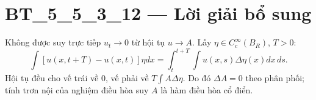 \documentclass[10pt,a4paper]{article}
\begin{document}
\section*{BT\_5\_5\_3\_12 — Lời giải bổ sung}
Không được suy trực tiếp $u_t\to0$ từ hội tụ $u\to A$. Lấy $\eta\in C_c^\infty(B_R)$, $T>0$:
\[\int[u(x,t+T)-u(x,t)]\eta dx=\int_t^{t+T}\int u(x,s)\Delta\eta(x)dx\,ds.\]
Hội tụ đều cho vế trái về 0, vế phải về $T\int A\Delta\eta$. Do đó $\Delta A=0$ theo phân phối; tính trơn nội của nghiệm điều hòa suy $A$ là hàm điều hòa cổ điển.
\end{document}
